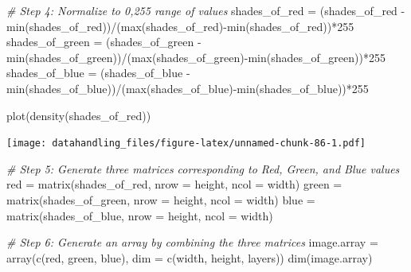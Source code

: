\documentclass[
  12pt,
]{style/krantz}
\newenvironment{Shaded}{\begin{snugshade}}{\end{snugshade}}
\newcommand{\AttributeTok}[1]{\textcolor[rgb]{0.77,0.63,0.00}{#1}}
\newcommand{\CommentTok}[1]{\textcolor[rgb]{0.56,0.35,0.01}{\textit{#1}}}
\newcommand{\DecValTok}[1]{\textcolor[rgb]{0.00,0.00,0.81}{#1}}
\newcommand{\FunctionTok}[1]{\textcolor[rgb]{0.00,0.00,0.00}{#1}}
\newcommand{\NormalTok}[1]{#1}
\newcommand{\OtherTok}[1]{\textcolor[rgb]{0.56,0.35,0.01}{#1}}
\newcommand{\SpecialCharTok}[1]{\textcolor[rgb]{0.00,0.00,0.00}{#1}}
\begin{document}
\begin{Shaded}
\begin{Highlighting}[]
\CommentTok{\# Step 4: Normalize to 0,255 range of values}
\NormalTok{shades\_of\_red }\OtherTok{=}\NormalTok{ (shades\_of\_red }\SpecialCharTok{{-}} \FunctionTok{min}\NormalTok{(shades\_of\_red))}\SpecialCharTok{/}\NormalTok{(}\FunctionTok{max}\NormalTok{(shades\_of\_red)}\SpecialCharTok{{-}}\FunctionTok{min}\NormalTok{(shades\_of\_red))}\SpecialCharTok{*}\DecValTok{255}
\NormalTok{shades\_of\_green }\OtherTok{=}\NormalTok{ (shades\_of\_green }\SpecialCharTok{{-}} \FunctionTok{min}\NormalTok{(shades\_of\_green))}\SpecialCharTok{/}\NormalTok{(}\FunctionTok{max}\NormalTok{(shades\_of\_green)}\SpecialCharTok{{-}}\FunctionTok{min}\NormalTok{(shades\_of\_green))}\SpecialCharTok{*}\DecValTok{255}
\NormalTok{shades\_of\_blue }\OtherTok{=}\NormalTok{ (shades\_of\_blue }\SpecialCharTok{{-}} \FunctionTok{min}\NormalTok{(shades\_of\_blue))}\SpecialCharTok{/}\NormalTok{(}\FunctionTok{max}\NormalTok{(shades\_of\_blue)}\SpecialCharTok{{-}}\FunctionTok{min}\NormalTok{(shades\_of\_blue))}\SpecialCharTok{*}\DecValTok{255}

\FunctionTok{plot}\NormalTok{(}\FunctionTok{density}\NormalTok{(shades\_of\_red))}
\end{Highlighting}
\end{Shaded}

\texttt{[image: datahandling\_files/figure-latex/unnamed-chunk-86-1.pdf]}

\begin{Shaded}
\begin{Highlighting}[]
\CommentTok{\# Step 5: Generate three matrices corresponding to Red, Green, and Blue values}
\NormalTok{red }\OtherTok{=} \FunctionTok{matrix}\NormalTok{(shades\_of\_red, }\AttributeTok{nrow =}\NormalTok{ height, }\AttributeTok{ncol =}\NormalTok{ width)}
\NormalTok{green }\OtherTok{=} \FunctionTok{matrix}\NormalTok{(shades\_of\_green, }\AttributeTok{nrow =}\NormalTok{ height, }\AttributeTok{ncol =}\NormalTok{ width)}
\NormalTok{blue }\OtherTok{=} \FunctionTok{matrix}\NormalTok{(shades\_of\_blue, }\AttributeTok{nrow =}\NormalTok{ height, }\AttributeTok{ncol =}\NormalTok{ width)}

\CommentTok{\# Step 6: Generate an array by combining the three matrices}
\NormalTok{image.array }\OtherTok{=} \FunctionTok{array}\NormalTok{(}\FunctionTok{c}\NormalTok{(red, green, blue), }\AttributeTok{dim =} \FunctionTok{c}\NormalTok{(width, height, layers))}
\FunctionTok{dim}\NormalTok{(image.array)}
\end{Highlighting}
\end{Shaded}
\end{document}
